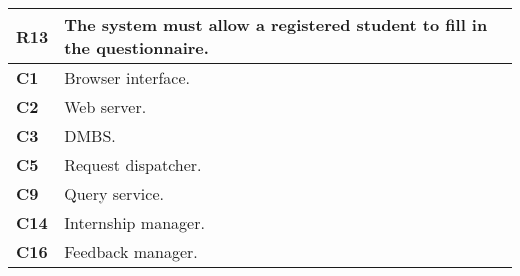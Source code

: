 \begin{table}[H]
    \centering
    \begin{tabular}{|l|m{10cm}|}
        \hline \textbf{R13} & The system must allow a registered student to fill in the questionnaire.\\
        \hline \textbf{C1} & Browser interface. \\
        \hline \textbf{C2} & Web server. \\
        \hline \textbf{C3} & DMBS. \\
        \hline \textbf{C5} & Request dispatcher. \\
        \hline \textbf{C9} & Query service. \\
        \hline \textbf{C14} & Internship manager. \\
        \hline \textbf{C16} & Feedback manager. \\
        \hline
    \end{tabular}
\end{table}

